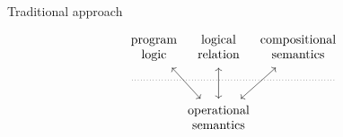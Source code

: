 \documentclass[aspectratio=1610,mathserif]{beamer}
\begin{document}
\begin{frame}[fragile]{Traditional approach} %
  \[
    \begin{tikzcd}[column sep=-1em, row sep=small]
      &
      \begin{array}{c} \text{program} \\ \text{logic} \end{array}
      \ar[ddr, leftrightarrow] &
      \begin{array}{c} \text{logical} \\ \text{relation} \end{array}
      \ar[dd, leftrightarrow] &
      \begin{array}{c} \text{compositional} \\ \text{semantics} \end{array}
      \ar[ddl, leftrightarrow]
      \\
      {} \ar[rrrr, dotted, dash] &&&& {}
      \\
      & &
      \begin{array}{c} \text{operational} \\ \text{semantics} \end{array}
    \end{tikzcd}
  \]
\end{frame}
\end{document}
